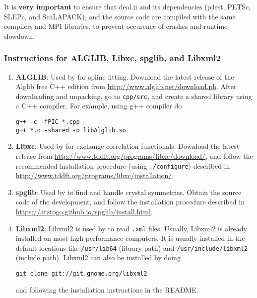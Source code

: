 It is {\bf very important} to ensure that deal.ii and its dependencies (p4est, PETSc, SLEPc, and ScaLAPACK), and the \dftfe{} source code are compiled with the same compilers and MPI libraries, to prevent occurence of crashes and runtime slowdown.  

\subsubsection{Instructions for ALGLIB, Libxc, spglib, and Libxml2}
\begin{enumerate}
	\item   {\bf ALGLIB}: Used by \dftfe{} for spline fitting. Download the latest release of the Alglib free C++ edition from \url{http://www.alglib.net/download.ph}. After downloading and unpacking, go to \verb|cpp/src|, and create a shared library using a C++ compiler. For example, using g++ compiler do
\begin{verbatim}
g++ -c -fPIC *.cpp
g++ *.o -shared -o libAlglib.so
\end{verbatim}
\item {\bf Libxc}: Used by \dftfe{} for exchange-correlation functionals. Download the latest release from \url{http://www.tddft.org/programs/libxc/download/}, and follow the recommended installation procedure (using \verb|./configure|) described in \url{http://www.tddft.org/programs/libxc/installation/}.

\item {\bf spglib}: Used by \dftfe{} to find and handle crystal symmetries. Obtain the source code of the development, and follow the installation procedure described in \url{https://atztogo.github.io/spglib/install.html}.   	

\item {\bf Libxml2}: Libxml2 is used by \dftfe{} to read \verb|.xml| files. Usually, Libxml2 is already installed on most high-performance computers. It is usually installed in the default locations like \verb|/usr/lib64| (library path) and \verb|/usr/include/libxml2| (include path). Libxml2 can also be installed by doing
\begin{verbatim}
git clone git://git.gnome.org/libxml2	
\end{verbatim}
and following the installation instructions in the README.
\end{enumerate}

